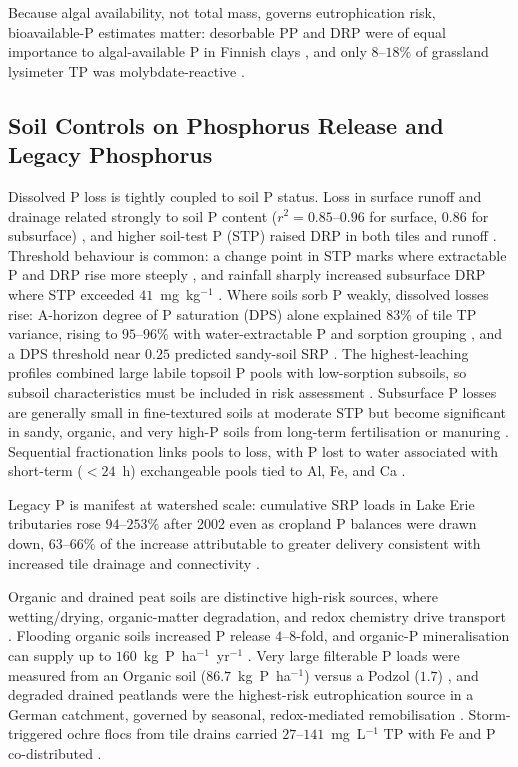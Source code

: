 Because algal availability, not total mass, governs eutrophication risk,
bioavailable-P estimates matter: desorbable PP and DRP were of equal
importance to algal-available P in Finnish clays
\parencite{Uusitalo2001,Uusitalo2003}, and only $8$--$18\%$ of grassland
lysimeter TP was molybdate-reactive \parencite{Bilotta2008}.

\subsection{Soil Controls on Phosphorus Release and Legacy Phosphorus}

Dissolved P loss is tightly coupled to soil P status. Loss in surface runoff
and drainage related strongly to soil P content
($r^2 = 0.85$--$0.96$ for surface, $0.86$ for subsurface)
\parencite{Sharpley1995}, and higher soil-test P (STP) raised DRP in both
tiles and runoff \parencite{Osterholz2020}. Threshold behaviour is common: a
change point in STP marks where extractable P and DRP rise more steeply
\parencite{McDowell2001b}, and rainfall sharply increased subsurface DRP
where STP exceeded $41$~mg~kg$^{-1}$ \parencite{Ni2020}. Where soils sorb P
weakly, dissolved losses rise: A-horizon degree of P saturation (DPS) alone
explained $83\%$ of tile TP variance, rising to $95$--$96\%$ with
water-extractable P and sorption grouping \parencite{Beauchemin2003}, and a
DPS threshold near $0.25$ predicted sandy-soil SRP \parencite{Siemens2004}.
The highest-leaching profiles combined large labile topsoil P pools with
low-sorption subsoils, so subsoil characteristics must be included in risk
assessment \parencite{Liu2024b}. Subsurface P losses are generally small in
fine-textured soils at moderate STP but become significant in sandy,
organic, and very high-P soils from long-term fertilisation or manuring
\parencite{Sims1998}. Sequential fractionation links pools to loss, with P
lost to water associated with short-term ($<24$~h) exchangeable pools tied to
Al, Fe, and Ca \parencite{McDowell2001}.

Legacy P is manifest at watershed scale: cumulative SRP loads in Lake Erie
tributaries rose $94$--$253\%$ after 2002 even as cropland P balances were
drawn down, $63$--$66\%$ of the increase attributable to greater delivery
consistent with increased tile drainage and connectivity
\parencite{Jarvie2017}.

Organic and drained peat soils are distinctive high-risk sources, where
wetting/drying, organic-matter degradation, and redox chemistry drive
transport \parencite{Grenon2021}. Flooding organic soils increased P release
$4$--$8$-fold, and organic-P mineralisation can supply up to
$160$~kg~P~ha$^{-1}$~yr$^{-1}$ \parencite{Sharpley1995}. Very large filterable
P loads were measured from an Organic soil ($86.7$~kg~P~ha$^{-1}$) versus a
Podzol ($1.7$) \parencite{McDowell2015b}, and degraded drained peatlands were
the highest-risk eutrophication source in a German catchment, governed by
seasonal, redox-mediated remobilisation \parencite{Tiemeyer2009,YliHalla2022}.
Storm-triggered ochre flocs from tile drains carried $27$--$141$~mg~L$^{-1}$
TP with Fe and P co-distributed \parencite{Zimmer2016}.

